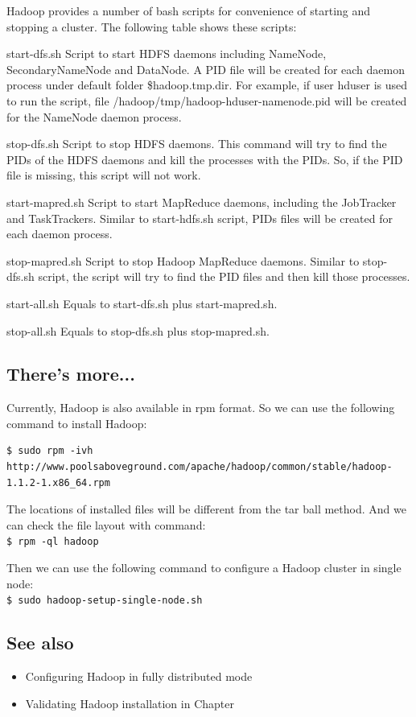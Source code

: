 Hadoop provides a number of bash scripts for convenience of starting and stopping a cluster. The following table shows these scripts:
\begin{description}
    \item{start-dfs.sh} Script to start HDFS daemons including NameNode, SecondaryNameNode and DataNode. A PID file will be created for each daemon process under default folder \${hadoop.tmp.dir}. For example, if user hduser is used to run the script, file /hadoop/tmp/hadoop-hduser-namenode.pid will be created for the NameNode daemon process.
    \item{stop-dfs.sh} Script to stop HDFS daemons. This command will try to find the PIDs of the HDFS daemons and kill the processes with the PIDs. So, if the PID file is missing, this script will not work.
    \item{start-mapred.sh} Script to start MapReduce daemons, including the JobTracker and TaskTrackers. Similar to start-hdfs.sh script, PIDs files will be created for each daemon process.
    \item{stop-mapred.sh} Script to stop Hadoop MapReduce daemons. Similar to stop-dfs.sh script, the script will try to find the PID files and then kill those processes.
    \item{start-all.sh} Equals to start-dfs.sh plus start-mapred.sh.
    \item{stop-all.sh} Equals to stop-dfs.sh plus stop-mapred.sh.
\end{description}
\subsection*{There's more...}
Currently, Hadoop is also available in rpm format. So we can use the following command to install Hadoop:
\lstset{style=bashstyle}
\begin{lstlisting}
$ sudo rpm -ivh http://www.poolsaboveground.com/apache/hadoop/common/stable/hadoop-1.1.2-1.x86_64.rpm
\end{lstlisting}

The locations of installed files will be different from the tar ball method. And we can check the file layout with command: \\
\verb|$ rpm -ql hadoop|

Then we can use the following command to configure a Hadoop cluster in single node: \\
\verb|$ sudo hadoop-setup-single-node.sh|
\subsection*{See also}
\begin{itemize}
  \item Configuring Hadoop in fully distributed mode
  \item Validating Hadoop installation in Chapter
\end{itemize}

